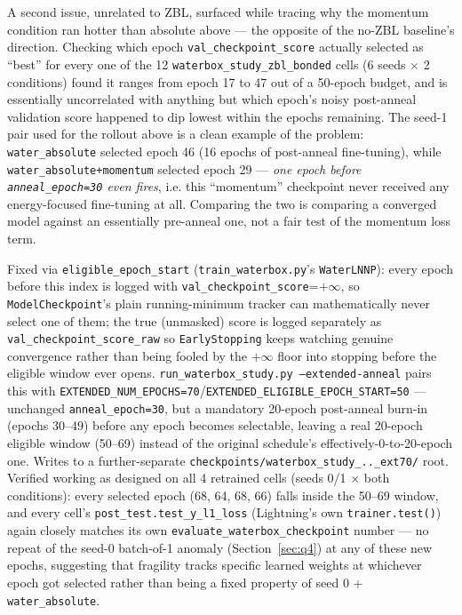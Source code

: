 \documentclass[11pt]{article}
\begin{document}
A second issue, unrelated to ZBL, surfaced while tracing why the momentum
condition ran hotter than absolute above --- the opposite of the no-ZBL
baseline's direction. Checking which epoch \texttt{val\_checkpoint\_score}
actually selected as ``best'' for every one of the 12
\texttt{waterbox\_study\_zbl\_bonded} cells (6 seeds $\times$ 2 conditions)
found it ranges from epoch 17 to 47 out of a 50-epoch budget, and is
essentially uncorrelated with anything but which epoch's noisy post-anneal
validation score happened to dip lowest within the epochs remaining. The
seed-1 pair used for the rollout above is a clean example of the problem:
\texttt{water\_absolute} selected epoch 46 (16 epochs of post-anneal
fine-tuning), while \texttt{water\_absolute+momentum} selected epoch 29 ---
\emph{one epoch before \texttt{anneal\_epoch=30} even fires}, i.e. this
``momentum'' checkpoint never received any energy-focused fine-tuning at
all. Comparing the two is comparing a converged model against an
essentially pre-anneal one, not a fair test of the momentum loss term.

Fixed via \texttt{eligible\_epoch\_start} (\texttt{train\_waterbox.py}'s
\texttt{WaterLNNP}): every epoch before this index is logged with
\texttt{val\_checkpoint\_score}=$+\infty$, so \texttt{ModelCheckpoint}'s
plain running-minimum tracker can mathematically never select one of them;
the true (unmasked) score is logged separately as
\texttt{val\_checkpoint\_score\_raw} so \texttt{EarlyStopping} keeps
watching genuine convergence rather than being fooled by the $+\infty$
floor into stopping before the eligible window ever opens.
\texttt{run\_waterbox\_study.py --extended-anneal} pairs this with
\texttt{EXTENDED\_NUM\_EPOCHS=70}/\texttt{EXTENDED\_ELIGIBLE\_EPOCH\_START=50}
--- unchanged \texttt{anneal\_epoch=30}, but a mandatory 20-epoch post-anneal
burn-in (epochs 30--49) before any epoch becomes selectable, leaving a real
20-epoch eligible window (50--69) instead of the original schedule's
effectively-0-to-20-epoch one. Writes to a further-separate
\texttt{checkpoints/waterbox\_study\_..\_ext70/} root. Verified working as
designed on all 4 retrained cells (seeds 0/1 $\times$ both conditions):
every selected epoch (68, 64, 68, 66) falls inside the 50--69 window, and
every cell's \texttt{post\_test.test\_y\_l1\_loss} (Lightning's own
\texttt{trainer.test()}) again closely matches its own
\texttt{evaluate\_waterbox\_checkpoint} number --- no repeat of the
seed-0 batch-of-1 anomaly (Section~\ref{sec:q4}) at any of these new
epochs, suggesting that fragility tracks specific learned weights at
whichever epoch got selected rather than being a fixed property of
seed 0 + \texttt{water\_absolute}.
\end{document}

